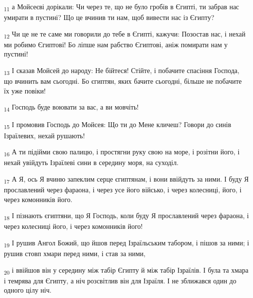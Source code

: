 \begin{tcolorbox}
\textsubscript{11} а Мойсеєві дорікали: Чи через те, що не було гробів в Єгипті, ти забрав нас умирати в пустині? Що це вчинив ти нам, щоб вивести нас із Єгипту?
\end{tcolorbox}
\begin{tcolorbox}
\textsubscript{12} Чи це не те саме ми говорили до тебе в Єгипті, кажучи: Позостав нас, і нехай ми робимо Єгиптові! Бо ліпше нам рабство Єгиптові, аніж помирати нам у пустині!
\end{tcolorbox}
\begin{tcolorbox}
\textsubscript{13} І сказав Мойсей до народу: Не бійтеся! Стійте, і побачите спасіння Господа, що вчинить вам сьогодні. Бо єгиптян, яких бачите сьогодні, більше не побачите їх уже повіки!
\end{tcolorbox}
\begin{tcolorbox}
\textsubscript{14} Господь буде воювати за вас, а ви мовчіть!
\end{tcolorbox}
\begin{tcolorbox}
\textsubscript{15} І промовив Господь до Мойсея: Що ти до Мене кличеш? Говори до синів Ізраїлевих, нехай рушають!
\end{tcolorbox}
\begin{tcolorbox}
\textsubscript{16} А ти підійми свою палицю, і простягни руку свою на море, і розітни його, і нехай увійдуть Ізраїлеві сини в середину моря, на суходіл.
\end{tcolorbox}
\begin{tcolorbox}
\textsubscript{17} А Я, ось Я вчиню запеклим серце єгиптянам, і вони ввійдуть за ними. І буду Я прославлений через фараона, і через усе його військо, і через колесниці, його, і через комонників його.
\end{tcolorbox}
\begin{tcolorbox}
\textsubscript{18} І пізнають єгиптяни, що Я Господь, коли буду Я прославлений через фараона, і через колесниці його, і через комонників його!
\end{tcolorbox}
\begin{tcolorbox}
\textsubscript{19} І рушив Ангол Божий, що йшов перед Ізраїльським табором, і пішов за ними; і рушив стовп хмари перед ними, і став за ними,
\end{tcolorbox}
\begin{tcolorbox}
\textsubscript{20} і ввійшов він у середину між табір Єгипту й між табір Ізраїлів. І була та хмара і темрява для Єгипту, а ніч розсвітлив він для Ізраїля. І не зближався один до одного цілу ніч.
\end{tcolorbox}
